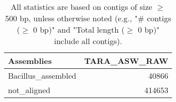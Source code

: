 \documentclass[12pt,a4paper]{article}
\begin{document}
\begin{table}[ht]
\begin{center}
\caption{All statistics are based on contigs of size $\geq$ 500 bp, unless otherwise noted (e.g., "\# contigs ($\geq$ 0 bp)" and "Total length ($\geq$ 0 bp)" include all contigs).}
\begin{tabular}{|l*{1}{|r}|}
\hline
Assemblies & TARA\_ASW\_RAW \\ \hline
Bacillus\_assembled & 40866 \\ \hline
not\_aligned & 414653 \\ \hline
\end{tabular}
\end{center}
\end{table}
\end{document}
